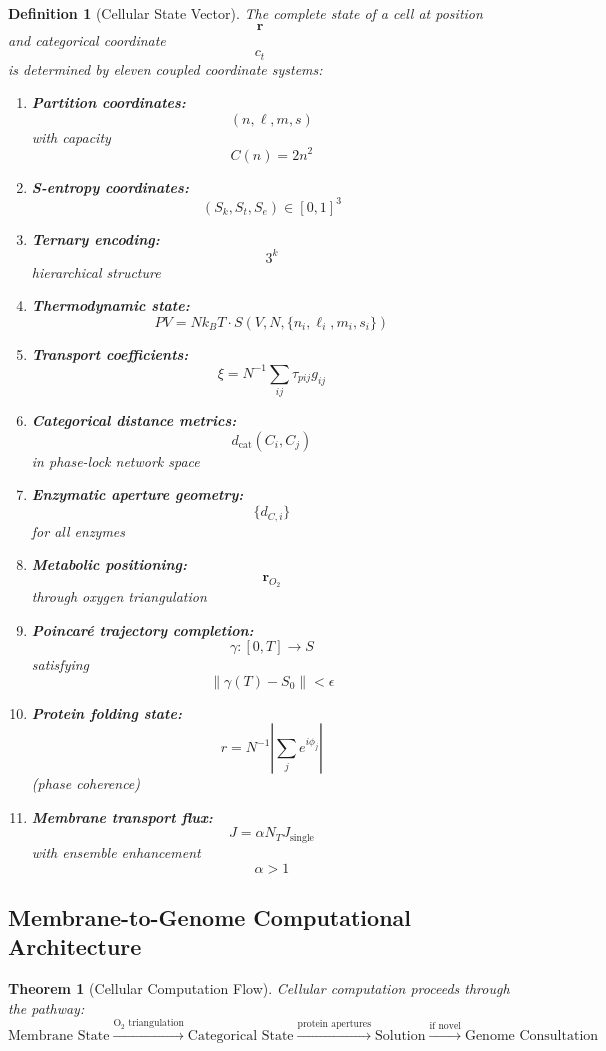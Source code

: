 \documentclass[12pt,a4paper]{article}
\newtheorem{theorem}{Theorem}
\newtheorem{definition}{Definition}
\begin{document}
\begin{definition}[Cellular State Vector]
The complete state of a cell at position $$\mathbf{r}$$ and categorical coordinate $$c_t$$ is determined by eleven coupled coordinate systems:

\begin{enumerate}
\item \textbf{Partition coordinates:} $$(n, \ell, m, s)$$ with capacity $$C(n) = 2n^2$$
\item \textbf{S-entropy coordinates:} $$(S_k, S_t, S_e) \in [0,1]^3$$
\item \textbf{Ternary encoding:} $$3^k$$ hierarchical structure
\item \textbf{Thermodynamic state:} $$PV = Nk_B T \cdot S(V, N, \{n_i, \ell_i, m_i, s_i\})$$
\item \textbf{Transport coefficients:} $$\xi = N^{-1} \sum_{ij} \tau_{pij} g_{ij}$$
\item \textbf{Categorical distance metrics:} $$d_{\text{cat}}(C_i, C_j)$$ in phase-lock network space
\item \textbf{Enzymatic aperture geometry:} $$\{d_{C,i}\}$$ for all enzymes
\item \textbf{Metabolic positioning:} $$\mathbf{r}_{O_2}$$ through oxygen triangulation
\item \textbf{Poincaré trajectory completion:} $$\gamma: [0,T] \to S$$ satisfying $$\|\gamma(T) - S_0\| < \epsilon$$
\item \textbf{Protein folding state:} $$r = N^{-1} |\sum_j e^{i\phi_j}|$$ (phase coherence)
\item \textbf{Membrane transport flux:} $$J = \alpha N_T J_{\text{single}}$$ with ensemble enhancement $$\alpha > 1$$
\end{enumerate}
\end{definition}

\subsection{Membrane-to-Genome Computational Architecture}

\begin{theorem}[Cellular Computation Flow]
Cellular computation proceeds through the pathway:
$$
\text{Membrane State} \xrightarrow{\text{O}_2 \text{ triangulation}} \text{Categorical State} \xrightarrow{\text{protein apertures}} \text{Solution} \xrightarrow{\text{if novel}} \text{Genome Consultation}
$$
\end{theorem}
\end{document}
